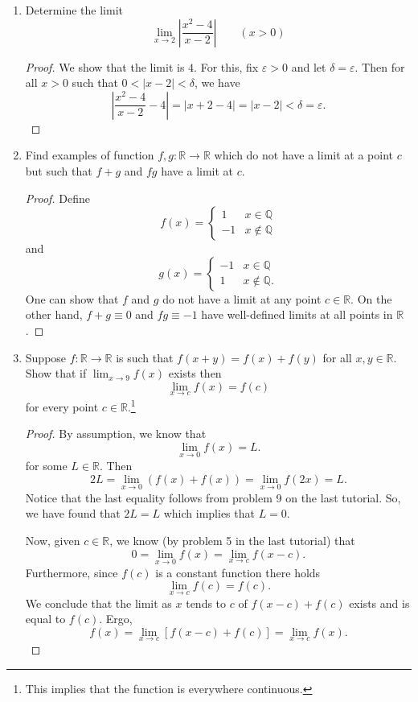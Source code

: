 \documentclass[12pt, reqno]{article}
\numberwithin{equation}{section}
\theoremstyle{definition}
\theoremstyle{remark}
\newcommand{\QQ}{\mathbb{Q}}
\newcommand{\RR}{\mathbb{R}}
\newcommand{\abs}[1]{\left\lvert#1\right\rvert}
\renewcommand{\epsilon}{\varepsilon}
\begin{document}
\begin{enumerate}[leftmargin=*]
	\item Determine the limit
	      \[
		      \lim_{x\to 2}\abs{\frac{x^2 - 4}{x-2}}\qquad (x>0)
	      \]
	      \begin{proof}
		      We show that the limit is $4$. For this, fix $\epsilon > 0$ and let $\delta = \epsilon$. Then for all $x > 0$ such that $0<\abs{x-2} < \delta$, we have
		      \[
			      \abs{\frac{x^2-4}{x-2} - 4} = \abs{x+2 - 4} = \abs{x-2} < \delta = \epsilon.
		      \]
	      \end{proof}

	\item Find examples of function $f, g :\RR\to \RR$ which do not have a limit at a point $c$ but such that $f+g$ and $fg$ have a limit at $c$.

	      \begin{proof}
		      Define
		      \[
			      f(x) = \begin{cases}
				      1  & x\in \QQ     \\
				      -1 & x\not\in \QQ
			      \end{cases}
		      \]
		      and
		      \[
			      g(x) = \begin{cases}
				      -1 & x\in \QQ      \\
				      1  & x\not\in \QQ.
			      \end{cases}
		      \]
		      One can show that $f$ and $g$ do not have a limit at any point $c\in \RR$. On the other hand, $f+g \equiv 0$ and $fg \equiv -1$ have well-defined limits at all points in $\RR$.
	      \end{proof}

	\item Suppose $f:\RR\to \RR$ is such that $f(x+y) = f(x) + f(y)$ for all $x,y\in \RR$. Show that if $\lim_{x\to 9}f(x)$ exists then
	      \[
		      \lim_{x\to c} f(x) = f(c)
	      \]
	      for every point $c\in \RR$.\footnote{This implies that the function is everywhere continuous.}

	      \begin{proof}
		      By assumption, we know that
		      \[
			      \lim_{x\to 0}f(x) = L.
		      \]
		      for some $L \in \RR$. Then
		      \[
			      2L = \lim_{x\to 0}\left(f(x) + f(x)\right) = \lim_{x\to 0} f(2x) = L.
		      \]
		      Notice that the last equality follows from problem 9 on the last tutorial. So, we have found that $2L = L$ which implies that $L = 0$.

		      Now, given $c\in \RR$, we know (by problem 5 in the last tutorial) that
		      \[
			      0 = \lim_{x\to 0} f(x) = \lim_{x\to c} f(x-c).
		      \]
		      Furthermore, since $f(c)$ is a constant function there holds
		      \[
			      \lim_{x\to c} f(c) = f(c).
		      \]
		      We conclude that the limit as $x$ tends to $c$ of $f(x-c) + f(c)$ exists and is equal to $f(c)$. Ergo,
		      \[
			      f(x) = \lim_{x\to c} \left[f(x-c) + f(c)\right] = \lim_{x\to c} f(x).
		      \]
	      \end{proof}



\end{enumerate}
\end{document}

